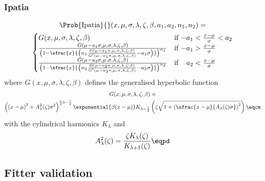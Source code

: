 \subsubsection{Ipatia}
\begin{multline}\label{sec:measurement_of_sin2beta:likelihood_fit:pdfs:ipatia}
  \Prob{\text{Ipatia}}{}(x, \mu, \sigma, \lambda, \zeta, \beta, a_1, a_2, n_1, n_2) = \\
    \begin{cases}
      G(x, \mu, \sigma, \lambda, \zeta, \beta)    & \text{if $-a_1 < \frac{x-\mu}{\sigma} < a_2$} \\
      \frac{G(\mu - a_1 \sigma, \mu, \sigma, \lambda, \zeta, \beta)}{
        \left( 1 - \sfrac{x}{\left( n_1 \frac{G(\mu - a_1 \sigma, \mu, \sigma, \lambda, \zeta, \beta)}{G^\prime(\mu - a_1 \sigma, \mu, \sigma, \lambda, \zeta, \beta)} - a_1 \sigma \right)} \right)^{n_1}
      }     & \text{if $-a_1 > \frac{x-\mu}{\sigma}$} \\
      \frac{G(\mu - a_2 \sigma, \mu, \sigma, \lambda, \zeta, \beta)}{
        \left( 1 - \sfrac{x}{\left( n_2 \frac{G(\mu - a_2 \sigma, \mu, \sigma, \lambda, \zeta, \beta)}{G^\prime(\mu - a_2 \sigma, \mu, \sigma, \lambda, \zeta, \beta)} - a_2 \sigma \right)} \right)^{n_2}
      }     & \text{if $\phantom{-}a_2 < \frac{x-\mu}{\sigma}$} \\
  \end{cases}
\end{multline}
%
where $G(x, \mu, \sigma, \lambda, \zeta, \beta)$ defines the generalised hyperbolic function
\begin{multline}\label{sec:measurement_of_sin2beta:likelihood_fit:pdfs:generalised_hyperbolic}
  G(x, \mu, \sigma, \lambda, \zeta, \beta) = \\
  \left(\left(x - \mu\right)^2 + A_\lambda^2(\zeta) \sigma^2 \right)^{\frac{1}{2} \lambda - \frac{1}{4}}
  \exponential{\beta (x - \mu)} K_{\lambda-\frac{1}{2}}
  \left(\zeta \sqrt{1 + \left(\sfrac{x - \mu}{A_\lambda(\zeta) \sigma}\right)^2} \right)\eqcm
\end{multline}
%
with the cylindrical harmonics $K_\lambda$ and
%
\begin{equation}
  A_\lambda^2(\zeta) = \frac{\zeta K_\lambda(\zeta)}{K_{\lambda+1}(\zeta)}\eqpd
\end{equation}
%


\newpage




\subsection{Fitter validation}
\label{sec:measurement_of_sin2beta:likelihood_fit:validation}
